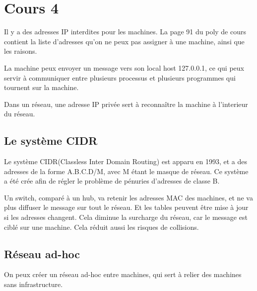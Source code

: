 \section{Cours 4}
Il y a des adresses IP interdites pour les machines. La page 91 du poly de cours contient la liste d'adresses qu'on
ne peux pas assigner à une machine, ainsi que les raisons.

La machine peux envoyer un message vers son local host 127.0.0.1, ce qui peux servir à communiquer entre plusieurs
processus et plusieurs programmes qui tournent sur la machine.

Dans un réseau, une adresse IP privée sert à reconnaître la machine à l'interieur du réseau.

\subsection{Le système CIDR}
Le système CIDR(Classless Inter Domain Routing) est apparu en 1993, et a des adresses de la forme A.B.C.D/M, avec
M étant le masque de réseau.
Ce système a été crée afin de régler le problème de pénuries d'adresses de classe B.

Un switch, comparé à un hub, va retenir les adresses MAC des machines, et ne va plus diffuser le message sur tout le
réseau. Et les tables peuvent être mise à jour si les adresses changent. Cela diminue la surcharge du réseau, car le
message est ciblé sur une machine. Cela réduit aussi les risques de collisions.

\subsection{Réseau ad-hoc}
On peux créer un réseau ad-hoc entre machines, qui sert à relier des machines sans infrastructure.
